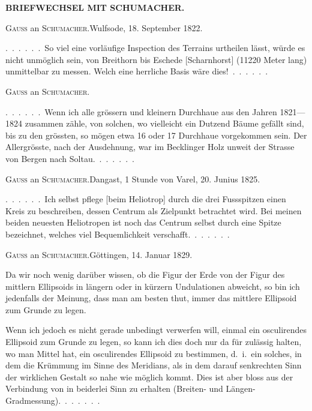 \clearpage
{}\hfill\textbf{BRIEFWECHSEL MIT SCHUMACHER.}
\begin{center}\textsc{Gauss} an \textsc{Schumacher}.\quad Wulfsode, 18. September 1822.\end{center}

.\ .\ .\ .\ .\ .\ So viel eine vorläufige Inspection des Terrains urtheilen lässt,
würde es nicht unmöglich sein,  von Breithorn bis Eschede
[Scharnhorst] (11220 Meter lang) unmittelbar zu messen. Welch eine herrliche
Basis wäre dies!\ .\ .\ .\ .\ .\ .

\begin{center}\textsc{Gauss} an \textsc{Schumacher}.\end{center}

.\ .\ .\ .\ .\ .\ Wenn ich alle grössern und kleinern Durchhaue aus den Jahren
1821---1824 zusammen zähle, von solchen, wo vielleicht ein Dutzend Bäume
gefällt sind, bis zu den grössten, so mögen etwa 16 oder 17 Durchhaue vorgekommen
sein. Der Allergrösste, nach der Ausdehnung, war im Becklinger
Holz unweit der Strasse von Bergen nach Soltau.\ .\ .\ .\ .\ .\ .

\begin{center}\textsc{Gauss} an \textsc{Schumacher}.\quad Dangast, 1 Stunde von Varel, 20. Junius 1825.\end{center}

.\ .\ .\ .\ .\ .\ Ich selbst pflege [beim Heliotrop] durch die drei Fussspitzen
einen Kreis zu beschreiben, dessen Centrum als Zielpunkt betrachtet wird.
Bei meinen beiden neuesten Heliotropen ist noch das Centrum selbst durch eine
Spitze bezeichnet, welches viel Bequemlichkeit verschafft.\ .\ .\ .\ .\ .\ .

\begin{center}\textsc{Gauss} an \textsc{Schumacher}.\quad Göttingen, 14. Januar 1829.\end{center}

Da wir noch wenig darüber wissen, ob die Figur der Erde von der Figur
des mittlern Ellipsoids in längern oder in kürzern Undulationen abweicht, so
bin ich jedenfalls der Meinung, dass man am besten thut, immer das mittlere
Ellipsoid zum Grunde zu legen.

Wenn ich jedoch es nicht gerade unbedingt verwerfen will, einmal ein
osculirendes Ellipsoid zum Grunde zu legen, so kann ich dies doch nur da
für zulässig halten, wo man Mittel hat, ein osculirendes Ellipsoid zu bestimmen,
d.\ i.\ ein solches, in dem die Krümmung  im Sinne des Meridians,
als in dem darauf senkrechten Sinn der wirklichen Gestalt so nahe wie
möglich kommt. Dies ist aber bloss aus der Verbindung von 
in beiderlei Sinn zu erhalten (Breiten- und Längen-Gradmessung).\ .\ .\ .\ .\ .\ .

